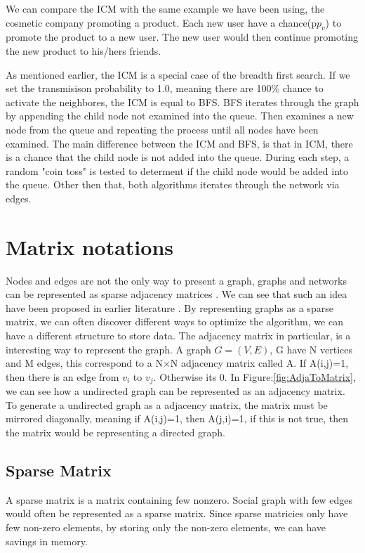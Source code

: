 {We can compare the ICM with the same example we have been using, the cosmetic company promoting a product. Each new user have a chance(p$p_v$) to promote the product to a new user. The new user would then continue promoting the new product to his/hers friends. 

As mentioned earlier, the ICM is a special case of the breadth first search. If we set the transmisison probability to 1.0, meaning there are 100\% chance to activate the neighbores, the ICM is equal to BFS. BFS iterates through the graph by appending the child node not examined into the queue. Then examines a new node from the queue and repeating the process until all nodes have been examined. The main difference between the ICM and BFS, is that in ICM, there is a chance that the child node is not added into the queue. During each step, a random "coin toss" is tested to determent if the child node would be added into the queue. Other then that, both algorithms iterates through the network via edges.

\section{Matrix notations}
Nodes and edges are not the only way to present a graph, graphs and networks can be represented as sparse adjacency matrices \cite{AlgoToMath}. We can see that such an idea have been proposed in earlier literature \cite{McAndrew1963}. By representing graphs as a sparse matrix, we can often discover different ways to optimize the algorithm, we can have a different structure to store data. The adjacency matrix in particular, is a interesting way to represent the graph. A graph $G =(V,E)$, G have N vertices and M edges, this correspond to a N$\times$N adjacency matrix called A. If A(i,j)=1, then there is an edge from $v_i$ to $v_j$. Otherwise its 0. In Figure:\ref{fig:AdjaToMatrix}, we can see how a undirected graph can be represented as an adjacency matrix. To generate a undirected graph as a adjacency matrix, the matrix must be mirrored diagonally, meaning if A(i,j)=1, then A(j,i)=1, if this is not true, then the matrix would be representing a directed graph.

\subsection{Sparse Matrix}
A sparse matrix is a matrix containing few nonzero. Social graph with few edges would often be represented as a sparse matrix. Since sparse matricies only have few non-zero elements, by storing only the non-zero elements, we can have savings in memory.

}
